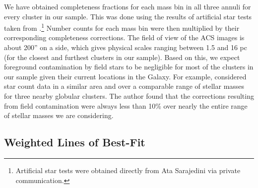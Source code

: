 We have obtained completeness fractions for each mass bin in all
three annuli for every cluster in our sample.  This was
done using the results of artificial star tests taken from
\citet{anderson08}.\footnote[2]{Artificial star tests were obtained
  directly from Ata
Sarajedini via private communication.}  Number counts for each mass
bin were then multiplied by their corresponding completeness
corrections.  The field of view of the ACS images is about
200'' on a side, which gives physical scales ranging between 1.5 and
16 pc (for the closest and furthest clusters in our sample).  Based on
this, we expect foreground contamination by field stars to be
negligible for most of the clusters in our sample given their current
locations in the Galaxy.  For example, \citet{dacosta82} considered
star count data 
in a similar area and over a comparable range of stellar masses for
three nearby globular clusters.  The author found that the 
corrections resulting from field contamination were always less than
10\% over nearly the entire range of stellar masses we are
considering.   



\subsection{Weighted Lines of Best-Fit} \label{lines}

